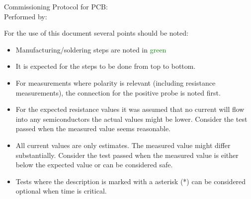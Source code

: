 \begin{Form}[]
\fontsize{25pt}{20}\selectfont Commissioning Protocol for PCB: \TextField[name=Title, bordercolor = black, borderstyle = U]{}\\

Performed by: \TextField[name=Name, bordercolor = black, borderstyle = U]{}
\end{Form}

\vspace{6cm}

For the use of this document several points should be noted:

\begin{itemize}
\item Manufacturing/soldering steps are noted in \textcolor{green}{green}
\item It is expected for the steps to be done from top to bottom.
\item For measurements where polarity is relevant (including resistance measurements), the connection for the positive probe is noted first.
\item For the expected resistance values it was assumed that no current will flow into any semiconductors the actual values might be lower. Consider the test passed when the measured value seems reasonable.
\item All current values are only estimates. The measured value might differ substantially. Consider the test passed when the measured value is either below the expected value or can  be considered safe.
\item Tests where the description is marked with a asterisk (*) can be considered optional when time is critical.



\end{itemize}

